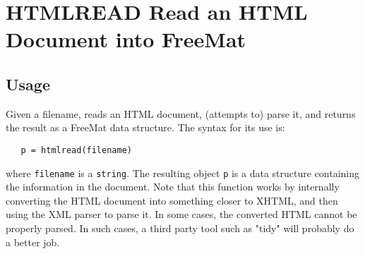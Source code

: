 \section{HTMLREAD Read an HTML Document into FreeMat}

\subsection{Usage}

Given a filename, reads an HTML document, (attempts to) parse it, and
returns the result as a FreeMat data structure.  The syntax for its
use is:
\begin{verbatim}
   p = htmlread(filename)
\end{verbatim}
where \verb|filename| is a \verb|string|.  The
resulting object \verb|p| is a data structure containing the information
in the document.  Note that this function works by internally converting
the HTML document into something closer to XHTML, and then using the
XML parser to parse it.  In some cases, the converted HTML cannot be properly
parsed.  In such cases, a third party tool such as "tidy" will probably do
a better job.
